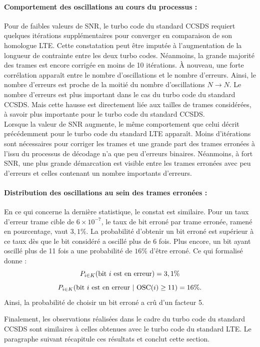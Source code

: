 \paragraph*{Comportement des oscillations au cours du processus  : }
Pour de faibles valeurs de SNR, le turbo code du standard CCSDS requiert quelques itérations supplémentaires pour converger en comparaison de son homologue
LTE. Cette constatation peut être imputée à l'augmentation de la longueur de contrainte entre les deux turbo codes. Néanmoins,
la grande majorité des trames est encore corrigée en moins de 10 itérations. À nouveau, une forte corrélation apparaît 
entre le nombre d'oscillations et le nombre d'erreurs. Ainsi, le nombre d'erreurs est proche de la moitié du nombre d'oscillations
$N \rightarrow N$. Le nombre d'erreurs est plus important dans le cas du turbo code du standard CCSDS. Mais cette hausse est
directement liée aux tailles de trames considérées, à savoir plus importante pour le turbo code du standard CCSDS.\\
Lorsque la valeur de SNR augmente, le même comportement que celui décrit précédemment pour le turbo code du standard LTE apparaît. 
Moins d'itérations sont nécessaires pour corriger les trames et une grande part des trames erronées à l'issu du processus de décodage 
n'a que peu d'erreurs binaires. Néanmoins, à fort SNR, une plus grande démarcation est visible entre les trames erronées 
avec peu d'erreurs et celles contenant un nombre importants d'erreurs.
\paragraph*{Distribution des oscillations au sein des trames erronées : }
En ce qui concerne la dernière statistique, le constat est similaire. Pour un  taux d'erreur trame 
cible de $6\times 10^{-7}$, le taux de bit erroné par trame erronée, ramené en pourcentage, vaut $3,1\%$. La probabilité
d'obtenir un bit erroné est supérieur à ce taux dès que le bit considéré a oscillé plus de 6 fois. Plus encore, un bit 
ayant oscillé plus de 11 fois a une probabilité de $16\%$ d'être erroné. Ce qui formalisé donne :
\[P_{i \in K} (\textnormal{bit } i \textnormal{ est en erreur}) = 3,1 \%\]
\[P_{i \in K} (\textnormal{bit } i \textnormal{ est en erreur}\ |\ \textnormal{OSC}(i) \geq 11 ) = 16 \%.\] 
Ainsi, la probabilité de choisir un bit erroné a crû d'un facteur 5. 

Finalement, les observations réalisées dans le cadre du turbo code du standard CCSDS sont similaires à celles obtenues avec
le turbo code du standard LTE. Le paragraphe suivant récapitule ces résultats et conclut cette section.

